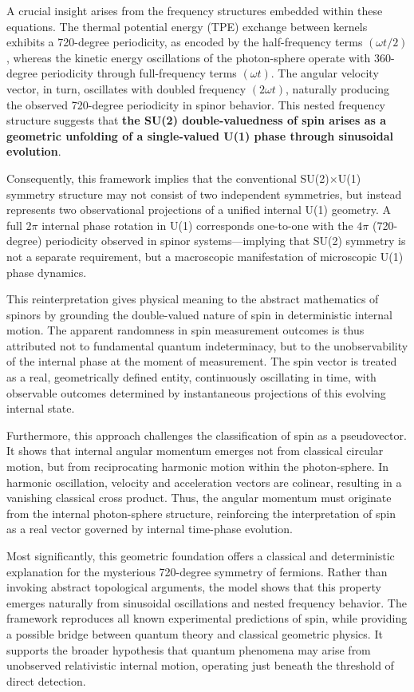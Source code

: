 \documentclass[%
 reprint,
 amsmath,amssymb,
 aps,
]{revtex4-1}
\numberwithin{equation}{section}%
\begin{document}
A crucial insight arises from the frequency structures embedded within these equations. The thermal potential energy (TPE) exchange between kernels exhibits a 720-degree periodicity, as encoded by the half-frequency terms $(\omega t / 2)$, whereas the kinetic energy oscillations of the photon-sphere operate with 360-degree periodicity through full-frequency terms $(\omega t)$. The angular velocity vector, in turn, oscillates with doubled frequency $(2\omega t)$, naturally producing the observed 720-degree periodicity in spinor behavior. This nested frequency structure suggests that \textbf{the SU(2) double-valuedness of spin arises as a geometric unfolding of a single-valued U(1) phase through sinusoidal evolution}.

Consequently, this framework implies that the conventional SU(2)$\times$U(1) symmetry structure may not consist of two independent symmetries, but instead represents two observational projections of a unified internal U(1) geometry. A full $2\pi$ internal phase rotation in U(1) corresponds one-to-one with the $4\pi$ (720-degree) periodicity observed in spinor systems—implying that SU(2) symmetry is not a separate requirement, but a macroscopic manifestation of microscopic U(1) phase dynamics.

This reinterpretation gives physical meaning to the abstract mathematics of spinors by grounding the double-valued nature of spin in deterministic internal motion. The apparent randomness in spin measurement outcomes is thus attributed not to fundamental quantum indeterminacy, but to the unobservability of the internal phase at the moment of measurement. The spin vector is treated as a real, geometrically defined entity, continuously oscillating in time, with observable outcomes determined by instantaneous projections of this evolving internal state.

Furthermore, this approach challenges the classification of spin as a pseudovector. It shows that internal angular momentum emerges not from classical circular motion, but from reciprocating harmonic motion within the photon-sphere. In harmonic oscillation, velocity and acceleration vectors are colinear, resulting in a vanishing classical cross product. Thus, the angular momentum must originate from the internal photon-sphere structure, reinforcing the interpretation of spin as a real vector governed by internal time-phase evolution.

Most significantly, this geometric foundation offers a classical and deterministic explanation for the mysterious 720-degree symmetry of fermions. Rather than invoking abstract topological arguments, the model shows that this property emerges naturally from sinusoidal oscillations and nested frequency behavior. The framework reproduces all known experimental predictions of spin, while providing a possible bridge between quantum theory and classical geometric physics. It supports the broader hypothesis that quantum phenomena may arise from unobserved relativistic internal motion, operating just beneath the threshold of direct detection.
\end{document}
